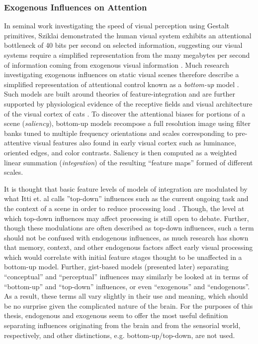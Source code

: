 \subsubsection{Exogenous Influences on Attention}

In seminal work investigating the speed of visual perception using Gestalt primitives, Sziklai demonstrated the human visual system exhibits an attentional bottleneck of 40 bits per second on selected information, suggesting our visual systems require a simplified representation from the many megabytes per second of information coming from exogenous visual information \cite{Sziklai1956,Merrill1968}.  Much research investigating exogenous influences on static visual scenes therefore describe a simplified representation of attentional control known as a \textit{bottom-up} model \cite{Koch1985,Itti1998,Wolfe1989,Itti2001}.  Such models are built around theories of feature-integration \cite{Treisman1980} and are further supported by physiological evidence of the receptive fields and visual architecture of the visual cortex of cats \cite{Hubel1962}.  To discover the attentional biases for portions of a scene (\textit{saliency}), bottom-up models recompose a full resolution image using filter banks tuned to multiple frequency orientations and scales corresponding to pre-attentive visual features also found in early visual cortex such as luminance, oriented edges, and color contrasts.  Saliency is then computed as a weighted linear summation (\textit{integration}) of the resulting ``feature maps'' formed of different scales. 

It is thought that basic feature levels of models of integration are modulated by what Itti et. al calls ''top-down'' influences \cite{Itti2001} such as the current ongoing task \cite{Yarbus1967,Smith2011a} and the context of a scene in order to reduce processing load \cite{Henderson2003,Torralba2006}.  Though, the level at which top-down influences may affect processing is still open to debate.  Further, though these modulations are often described as top-down influences, such a term should not be confused with endogenous influences, as much research has shown that memory, context, and other endogenous factors affect early visual processing \cite{Tatler2011} which would correlate with initial feature stages thought to be unaffected in a bottom-up model.  Further, gist-based models (presented later) separating ``conceptual'' and ``perceptual'' influences may similarly be looked at in terms of ``bottom-up'' and ``top-down'' influences, or even ``exogenous'' and ``endogenous''.  As a result, these terms all vary slightly in their use and meaning, which should be no surprise given the complicated nature of the brain.  For the purposes of this thesis, endogenous and exogenous seem to offer the most useful definition separating influences originating from the brain and from the sensorial world, respectively, and other distinctions, e.g. bottom-up/top-down, are not used. 

